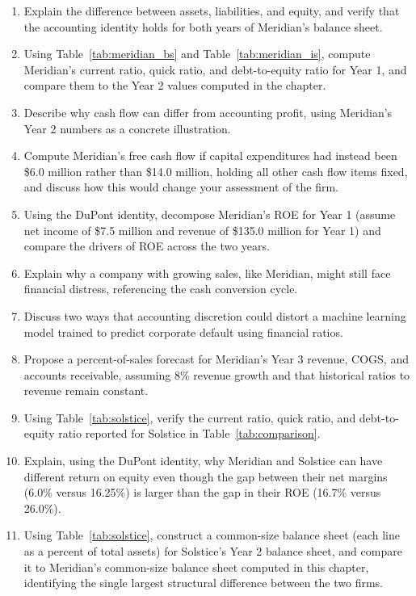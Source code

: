 \documentclass[../ai_in_finance]{subfiles}
\begin{document}
\begin{enumerate}
    \item Explain the difference between assets, liabilities, and equity, and verify that the accounting identity holds for both years of Meridian's balance sheet.
    \item Using Table~\ref{tab:meridian_bs} and Table~\ref{tab:meridian_is}, compute Meridian's current ratio, quick ratio, and debt-to-equity ratio for Year 1, and compare them to the Year 2 values computed in the chapter.
    \item Describe why cash flow can differ from accounting profit, using Meridian's Year 2 numbers as a concrete illustration.
    \item Compute Meridian's free cash flow if capital expenditures had instead been \$6.0 million rather than \$14.0 million, holding all other cash flow items fixed, and discuss how this would change your assessment of the firm.
    \item Using the DuPont identity, decompose Meridian's ROE for Year 1 (assume net income of \$7.5 million and revenue of \$135.0 million for Year 1) and compare the drivers of ROE across the two years.
    \item Explain why a company with growing sales, like Meridian, might still face financial distress, referencing the cash conversion cycle.
    \item Discuss two ways that accounting discretion could distort a machine learning model trained to predict corporate default using financial ratios.
    \item Propose a percent-of-sales forecast for Meridian's Year 3 revenue, COGS, and accounts receivable, assuming 8\% revenue growth and that historical ratios to revenue remain constant.
    \item Using Table~\ref{tab:solstice}, verify the current ratio, quick ratio, and debt-to-equity ratio reported for Solstice in Table~\ref{tab:comparison}.
    \item Explain, using the DuPont identity, why Meridian and Solstice can have different return on equity even though the gap between their net margins (6.0\% versus 16.25\%) is larger than the gap in their ROE (16.7\% versus 26.0\%).
    \item Using Table~\ref{tab:solstice}, construct a common-size balance sheet (each line as a percent of total assets) for Solstice's Year 2 balance sheet, and compare it to Meridian's common-size balance sheet computed in this chapter, identifying the single largest structural difference between the two firms.

\end{enumerate}
\end{document}
